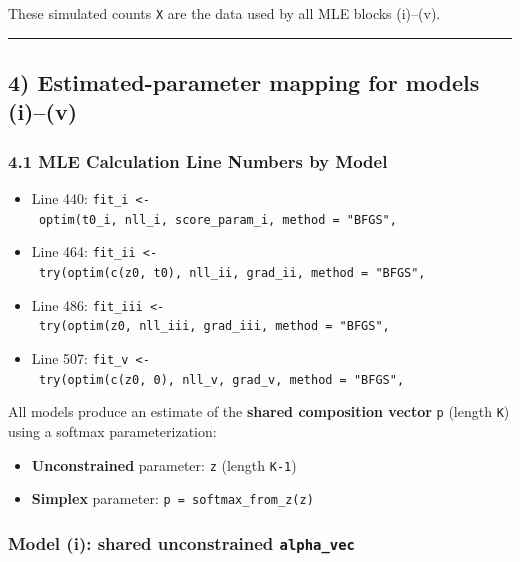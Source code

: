 \documentclass[
]{article}
\providecommand{\tightlist}{%
  \setlength{\itemsep}{0pt}\setlength{\parskip}{0pt}}
\begin{document}
These simulated counts \texttt{X} are the data used by all MLE blocks
(i)--(v).

\begin{center}\rule{0.5\linewidth}{0.5pt}\end{center}

\subsection{4) Estimated-parameter mapping for models
(i)--(v)}\label{estimated-parameter-mapping-for-models-iv}

\subsubsection{4.1 MLE Calculation Line Numbers by
Model}\label{mle-calculation-line-numbers-by-model}

\begin{itemize}
\tightlist
\item
  Line 440:
  \texttt{fit\_i\ \textless{}-\ optim(t0\_i,\ nll\_i,\ score\_param\_i,\ method\ =\ "BFGS",}
\item
  Line 464:
  \texttt{fit\_ii\ \textless{}-\ try(optim(c(z0,\ t0),\ nll\_ii,\ grad\_ii,\ method\ =\ "BFGS",}
\item
  Line 486:
  \texttt{fit\_iii\ \textless{}-\ try(optim(z0,\ nll\_iii,\ grad\_iii,\ method\ =\ "BFGS",}
\item
  Line 507:
  \texttt{fit\_v\ \textless{}-\ try(optim(c(z0,\ 0),\ nll\_v,\ grad\_v,\ method\ =\ "BFGS",}
\end{itemize}

All models produce an estimate of the \textbf{shared composition vector}
\texttt{p} (length \texttt{K}) using a softmax parameterization:

\begin{itemize}
\tightlist
\item
  \textbf{Unconstrained} parameter: \texttt{z} (length \texttt{K-1})
\item
  \textbf{Simplex} parameter: \texttt{p\ =\ softmax\_from\_z(z)}
\end{itemize}

\subsubsection{\texorpdfstring{Model (i): shared unconstrained
\texttt{alpha\_vec}}{Model (i): shared unconstrained alpha\_vec}}\label{model-i-shared-unconstrained-alpha_vec}
\end{document}
